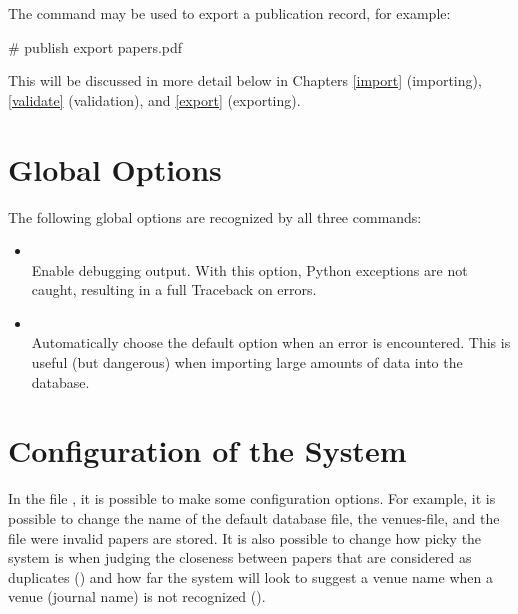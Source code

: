 The command  may be used to export a publication record,
for example:

\begin{code}
# publish export papers.pdf
\end{code}

This will be discussed in more detail below in Chapters \ref{import}
(importing), \ref{validate} (validation), and \ref{export}
(exporting).

\section{Global Options}

The following global options are recognized by all three commands:
\begin{itemize}
\item
   \\

  Enable debugging output. With this option, Python exceptions are not
  caught, resulting in a full Traceback on errors.
\item
   \\

  Automatically choose the default option when an error is
  encountered. This is useful (but dangerous) when importing large
  amounts of data into the database.
\end{itemize}

\section{Configuration of the System}

In the file , it is possible to make
some configuration options.  For example, it is possible to change the
name of the default database file, the venues-file, and the file were
invalid papers are stored.  It is also possible to change how picky
the system is when judging the closeness between papers that are
considered as duplicates () and how
far the system will look to suggest a venue name when a venue (journal
name) is not recognized ().

